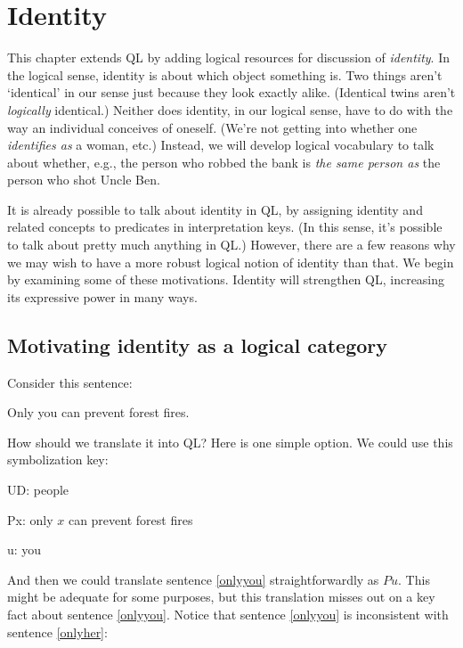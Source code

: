 \chapter{Identity}
\label{ch.identity}

This chapter extends QL by adding logical resources for discussion of \emph{identity}. In the logical sense, identity is about which object something is. Two things aren't `identical' in our sense just because they look exactly alike. (Identical twins aren't \emph{logically} identical.) Neither does identity, in our logical sense, have to do with the way an individual conceives of oneself. (We're not getting into whether one \emph{identifies as} a woman, etc.) Instead, we will develop logical vocabulary to talk about whether, e.g., the person who robbed the bank is \emph{the same person as} the person who shot Uncle Ben.

It is already possible to talk about identity in QL, by assigning identity and related concepts to predicates in interpretation keys. (In this sense, it's possible to talk about pretty much anything in QL.) However, there are a few reasons why we may wish to have a more robust logical notion of identity than that. We begin by examining some of these motivations. Identity will strengthen QL, increasing its expressive power in many ways.

\section{Motivating identity as a logical category}
\label{sec.identitymotivation}

Consider this sentence:

\begin{earg}
\item[\ex{onlyyou}] Only you can prevent forest fires.
\end{earg}

How should we translate it into QL? Here is one simple option. We could use this symbolization key:

\begin{ekey}
\item[UD:] people
\item[Px:] only $x$ can prevent forest fires
\item[u:] you
\end{ekey}

And then we could translate sentence \ref{onlyyou} straightforwardly as $Pu$. This might be adequate for some purposes, but this translation misses out on a key fact about sentence \ref{onlyyou}. Notice that sentence \ref{onlyyou} is inconsistent with sentence \ref{onlyher}:


